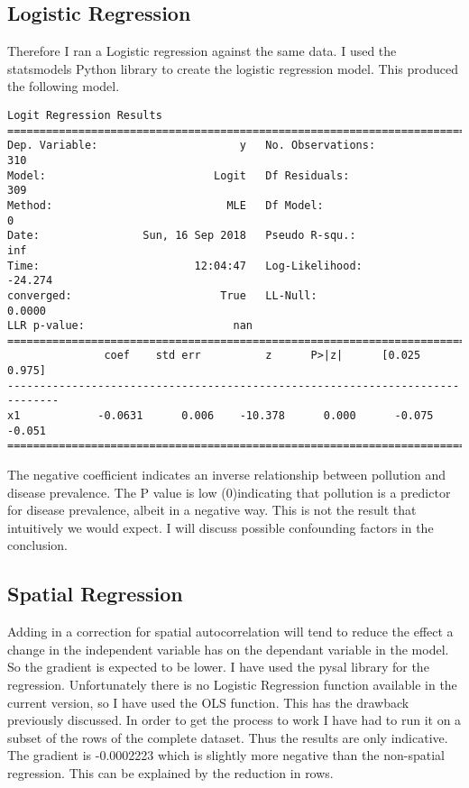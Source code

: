 \subsection{Logistic Regression}
Therefore I ran a Logistic regression against the same data.
I used the statsmodels Python library to create the logistic regression model. This produced the following model.

\begin{verbatim}
Logit Regression Results                           
==============================================================================
Dep. Variable:                      y   No. Observations:                  310
Model:                          Logit   Df Residuals:                      309
Method:                           MLE   Df Model:                            0
Date:                Sun, 16 Sep 2018   Pseudo R-squ.:                     inf
Time:                        12:04:47   Log-Likelihood:                -24.274
converged:                       True   LL-Null:                        0.0000
LLR p-value:                       nan
==============================================================================
               coef    std err          z      P>|z|      [0.025      0.975]
------------------------------------------------------------------------------
x1            -0.0631      0.006    -10.378      0.000      -0.075      -0.051
==============================================================================

\end{verbatim}

The negative coefficient indicates an inverse relationship between pollution and disease prevalence.
The P value is low (0)indicating that pollution is a predictor for disease prevalence, albeit in a negative way.
This is not the result that intuitively we would expect. I will discuss possible confounding factors in the conclusion.


\subsection{Spatial Regression}
Adding in a correction for spatial autocorrelation will tend to reduce the effect a change in the independent variable has on the dependant variable in the model. So the gradient is expected to be lower. I have used the pysal library for the regression. Unfortunately there is no Logistic Regression function available in the current version, so I have used the OLS function. This has the drawback previously discussed. In order to get the process to work I have had to run it on a subset of the rows of the complete dataset. Thus the results are only indicative. The gradient is -0.0002223 which is slightly more negative than the non-spatial regression. This can be explained by the reduction in rows.

